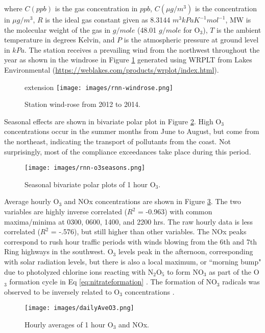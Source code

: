 \noindent
where $C(ppb)$ is the gas concentration in $ppb$, $C(\mu g/m^{3})$ is the concentration in $\mu g/m^{3}$, $R$ is the ideal gas constant given as 8.3144 $m^{3}kPa K^{-1}mol^{-1}$, MW is the molecular weight of the gas in $g/mole$ (48.01 $g/mole$ for O$_{3}$), $T$ is the ambient temperature in degrees Kelvin, and $P$ is the atmospheric pressure at ground level in $kPa$. The station receives a prevailing wind from the northwest throughout the year as shown in the windrose in Figure \ref{fig:windrose} generated using WRPLT from Lakes Environmental (\url{https://weblakes.com/products/wrplot/index.html}).
%
\begin{figure}[H]
\centering
 extension
\texttt{[image: images/rnn-windrose.png]} 
\caption{Station wind-rose from 2012 to 2014.}
\label{fig:windrose}
\end{figure}
%
Seasonal effects are shown in bivariate polar plot in Figure \ref{fig:bipolarplots}. High O$_{3}$ concentrations occur in the summer months from June to August, but come from the northeast, indicating the transport of pollutants from the coast. Not surprisingly, most of the compliance exceedances take place during this period.
%
\begin{figure}[H]
\centering
\texttt{[image: images/rnn-o3seasons.png]} 
\caption{Seasonal bivariate polar plots of 1 hour O$_3$.}
\label{fig:bipolarplots}
\end{figure}
%
Average hourly O$_{3}$ and NOx concentrations are shown in Figure \ref{fig:hourlyAveO3}. The two variables are highly inverse correlated ($R^{2}$ = -0.963) with common maxima/minima at 0300, 0600, 1400, and 2200 hrs. The raw hourly data is less correlated ($R^{2}$ = -.576), but still higher than other variables. The NOx peaks correspond to rush hour traffic periods with winds blowing from the 6th and 7th Ring highways in the southwest. O$_{3}$ levels peak in the afternoon, corresponding with solar radiation levels, but there is also a local maximum, or ``morning bump" due to photolyzed chlorine ions reacting with N$_{2}$O$_{5}$ to form NO$_{3}$ as part of the O$_{3}$ formation cycle in Eq \ref{eq:nitrateformation} \citep{Calvert2015}. The formation of NO$_{3}$ radicals was observed to be inversely related to O$_{3}$ concentrations \citep{Song2011}.
%
\begin{figure}[H]
\centering
\texttt{[image: images/dailyAveO3.png]}
\caption{Hourly averages of 1 hour O$_{3}$ and NOx.}
\label{fig:hourlyAveO3}
\end{figure}
%

